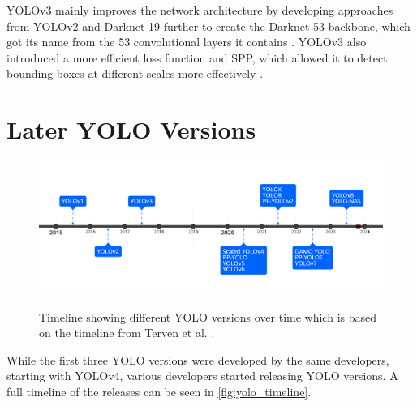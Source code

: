 \documentclass[10pt]{book}
\newcommand{\figureref}[1]{\autoref{#1}}
\begin{document}
\ac{YOLO}v3 mainly improves the network architecture by developing approaches from \ac{YOLO}v2 and Darknet-19 further to create the Darknet-53 backbone, which got its name from the 53 convolutional layers it contains \cite{redmon2018yolov3}. \ac{YOLO}v3 also introduced a more efficient loss function and \ac{SPP}, which allowed it to detect bounding boxes at different scales more effectively \cite{jani2023model}.

\section{Later YOLO Versions}

\begin{figure}
  \caption{Timeline showing different \ac{YOLO} versions over time which is based on the timeline from Terven et al. \cite{terven2023comprehensive}.}
  \includegraphics[width=\textwidth]{image/timeline_fix}
  \label{fig:yolo_timeline}
\end{figure}

While the first three \ac{YOLO} versions were developed by the same developers, starting with \ac{YOLO}v4, various developers started releasing \ac{YOLO} versions. A full timeline of the releases can be seen in \figureref{fig:yolo_timeline}. 
\end{document}
